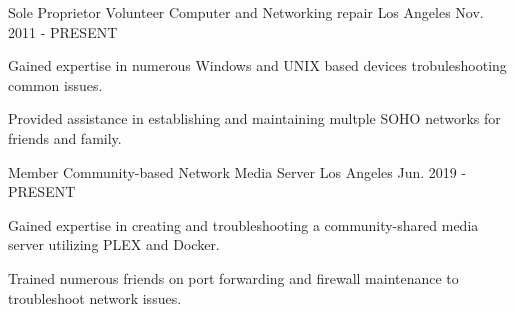 


\begin{cventries}


\cventry
{Sole Proprietor} %
{Volunteer Computer and Networking repair} %
{Los Angeles} %
{Nov. 2011 - PRESENT} %
{ %
\begin{cvitems}
\item {Gained expertise in numerous Windows and UNIX based devices trobuleshooting common issues.}
\item {Provided assistance in establishing and maintaining multple SOHO networks for friends and family.}
\end{cvitems}
}


\cventry
{Member} %
{Community-based Network Media Server} %
{Los Angeles} %
{Jun. 2019 - PRESENT} %
{ %
\begin{cvitems}
\item {Gained expertise in creating and troubleshooting a community-shared media server utilizing PLEX and Docker.}
\item {Trained numerous friends on port forwarding and firewall maintenance to troubleshoot network issues.}
\end{cvitems}
}


\end{cventries}